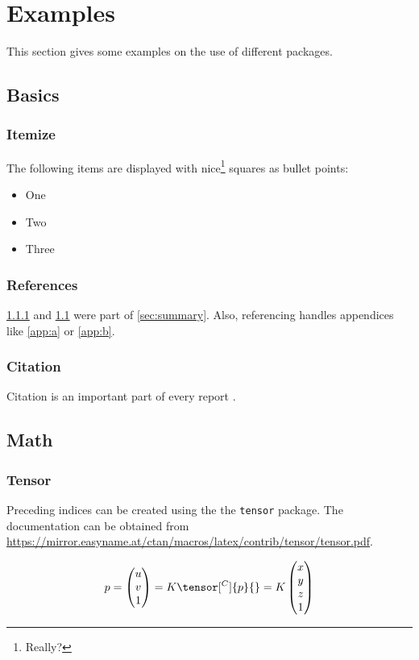 \section{Examples} \label{sec:examples}
This section gives some examples on the use of different packages.

\subsection{Basics} \label{sec:basics}

\subsubsection{Itemize} \label{sec:itemize}
The following items are displayed with nice\footnote{Really?} squares as bullet points:
\begin{itemize}
	\item One
	\item Two
	\item Three
\end{itemize}

\subsubsection{References} \label{sec:references}
\cref{sec:itemize} and \cref{sec:basics} were part of \cref{sec:summary}. Also, referencing handles appendices like \cref{app:a} or \cref{app:b}.

\subsubsection{Citation} \label{sec:citation}
Citation is an important part of every report \cite{Tietze2019}.


\subsection{Math} \label{sec:math}

\subsubsection{Tensor}

Preceding indices can be created using the the \verb|tensor| package. The documentation can be obtained from \url{https://mirror.easyname.at/ctan/macros/latex/contrib/tensor/tensor.pdf}.

\begin{equation}
	p =
	\begin{pmatrix}
		u\\
		v\\
		1
	\end{pmatrix}
	= K \tensor[^C]{p}{} = K  %
	\begin{pmatrix}
		x\\
		y\\
		z\\
		1
	\end{pmatrix}
\end{equation}

